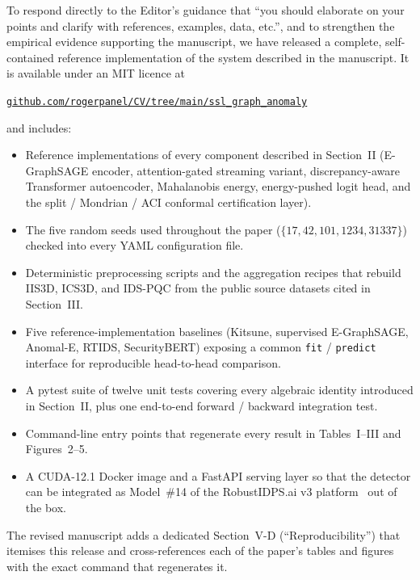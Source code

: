 \documentclass[11pt,a4paper]{article}
\begin{document}
To respond directly to the Editor's guidance that ``you should elaborate
on your points and clarify with references, examples, data, etc.'', and
to strengthen the empirical evidence supporting the manuscript, we have
released a complete, self-contained reference implementation of the
system described in the manuscript. It is available under an MIT
licence at
\begin{center}
\href{https://github.com/rogerpanel/CV/tree/main/ssl_graph_anomaly}%
{\texttt{github.com/rogerpanel/CV/tree/main/ssl\_graph\_anomaly}}
\end{center}
and includes:
\begin{itemize}[leftmargin=1.5em,itemsep=1pt,topsep=1pt]
  \item Reference implementations of every component described in
        Section~II (E-GraphSAGE encoder, attention-gated streaming
        variant, discrepancy-aware Transformer autoencoder,
        Mahalanobis energy, energy-pushed logit head, and the split /
        Mondrian / ACI conformal certification layer).
  \item The five random seeds used throughout the paper
        ($\{17, 42, 101, 1234, 31337\}$) checked into every YAML
        configuration file.
  \item Deterministic preprocessing scripts and the aggregation
        recipes that rebuild IIS3D, ICS3D, and IDS-PQC from the public
        source datasets cited in Section~III.
  \item Five reference-implementation baselines (Kitsune, supervised
        E-GraphSAGE, Anomal-E, RTIDS, SecurityBERT) exposing a common
        \texttt{fit} / \texttt{predict} interface for reproducible
        head-to-head comparison.
  \item A pytest suite of twelve unit tests covering every algebraic
        identity introduced in Section~II, plus one end-to-end
        forward / backward integration test.
  \item Command-line entry points that regenerate every result in
        Tables~I--III and Figures~2--5.
  \item A CUDA-12.1 Docker image and a FastAPI serving layer so that
        the detector can be integrated as Model~\#14 of the
        RobustIDPS.ai v3 platform~\cite{robustidpsai2026zenodo} out of
        the box.
\end{itemize}
The revised manuscript adds a dedicated Section~V-D
(``Reproducibility'') that itemises this release and cross-references
each of the paper's tables and figures with the exact command that
regenerates it.
\end{document}
